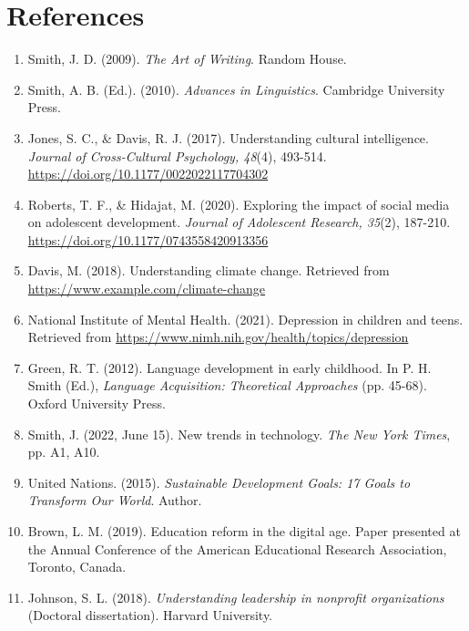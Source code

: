 \section{References}

\begin{enumerate}

\item Smith, J. D. (2009). \textit{The Art of Writing}. Random House.
\item Smith, A. B. (Ed.). (2010). \textit{Advances in Linguistics}. Cambridge University Press.
\item Jones, S. C., \& Davis, R. J. (2017). Understanding cultural intelligence. \textit{Journal of Cross-Cultural Psychology, 48}(4), 493-514. \url{https://doi.org/10.1177/0022022117704302}
\item Roberts, T. F., \& Hidajat, M. (2020). Exploring the impact of social media on adolescent development. \textit{Journal of Adolescent Research, 35}(2), 187-210. \url{https://doi.org/10.1177/0743558420913356}
\item Davis, M. (2018). Understanding climate change. Retrieved from \url{https://www.example.com/climate-change}
\item National Institute of Mental Health. (2021). Depression in children and teens. Retrieved from \url{https://www.nimh.nih.gov/health/topics/depression}
\item Green, R. T. (2012). Language development in early childhood. In P. H. Smith (Ed.), \textit{Language Acquisition: Theoretical Approaches} (pp. 45-68). Oxford University Press.
\item Smith, J. (2022, June 15). New trends in technology. \textit{The New York Times}, pp. A1, A10.
\item United Nations. (2015). \textit{Sustainable Development Goals: 17 Goals to Transform Our World}. Author.
\item Brown, L. M. (2019). Education reform in the digital age. Paper presented at the Annual Conference of the American Educational Research Association, Toronto, Canada.
\item Johnson, S. L. (2018). \textit{Understanding leadership in nonprofit organizations} (Doctoral dissertation). Harvard University.

\end{enumerate}

